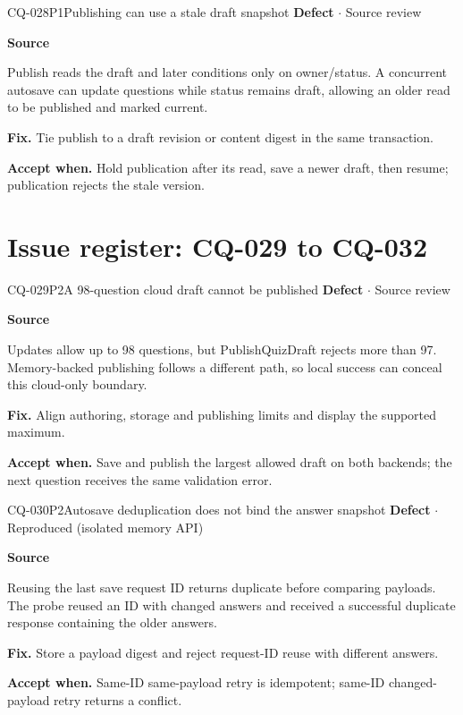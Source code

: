 \begin{finding}{CQ-028}{P1}{Publishing can use a stale draft snapshot}
\textbf{Defect} $\cdot$ Source review\par
\textbf{Source}\quad{}\par
Publish reads the draft and later conditions only on owner/status. A concurrent autosave can update questions while status remains draft, allowing an older read to be published and marked current.\par
\textbf{Fix.} Tie publish to a draft revision or content digest in the same transaction.\par
\textbf{Accept when.} Hold publication after its read, save a newer draft, then resume; publication rejects the stale version.
\end{finding}
\clearpage
\section*{Issue register: CQ-029 to CQ-032}
\begin{finding}{CQ-029}{P2}{A 98-question cloud draft cannot be published}
\textbf{Defect} $\cdot$ Source review\par
\textbf{Source}\quad{}\par
Updates allow up to 98 questions, but PublishQuizDraft rejects more than 97. Memory-backed publishing follows a different path, so local success can conceal this cloud-only boundary.\par
\textbf{Fix.} Align authoring, storage and publishing limits and display the supported maximum.\par
\textbf{Accept when.} Save and publish the largest allowed draft on both backends; the next question receives the same validation error.
\end{finding}
\begin{finding}{CQ-030}{P2}{Autosave deduplication does not bind the answer snapshot}
\textbf{Defect} $\cdot$ Reproduced (isolated memory API)\par
\textbf{Source}\quad{}\par
Reusing the last save request ID returns duplicate before comparing payloads. The probe reused an ID with changed answers and received a successful duplicate response containing the older answers.\par
\textbf{Fix.} Store a payload digest and reject request-ID reuse with different answers.\par
\textbf{Accept when.} Same-ID same-payload retry is idempotent; same-ID changed-payload retry returns a conflict.
\end{finding}
